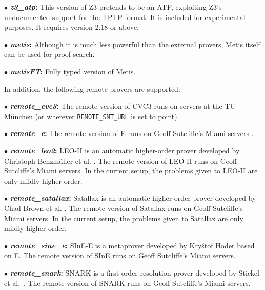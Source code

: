 \documentclass[a4paper,12pt]{article}
\begin{document}
\begin{enum}
\begin{enum}
\item[$\bullet$] \textbf{\textit{z3\_atp}:} This version of Z3 pretends to be an
ATP, exploiting Z3's undocumented support for the TPTP format. It is included
for experimental purposes. It requires version 2.18 or above.

\item[$\bullet$] \textbf{\textit{metis}:} Although it is much less powerful than
the external provers, Metis itself can be used for proof search.

\item[$\bullet$] \textbf{\textit{metisFT}:} Fully typed version of Metis.
\end{enum}

In addition, the following remote provers are supported:

\begin{enum}
\item[$\bullet$] \textbf{\textit{remote\_cvc3}:} The remote version of CVC3 runs
on servers at the TU M\"unchen (or wherever \texttt{REMOTE\_SMT\_URL} is set to
point).

\item[$\bullet$] \textbf{\textit{remote\_e}:} The remote version of E runs
on Geoff Sutcliffe's Miami servers \cite{sutcliffe-2000}.

\item[$\bullet$] \textbf{\textit{remote\_leo2}:} LEO-II is an automatic
higher-order prover developed by Christoph Benzm\"uller et al. \cite{leo2}. The
remote version of LEO-II runs on Geoff Sutcliffe's Miami servers. In the current
setup, the problems given to LEO-II are only mildly higher-order.

\item[$\bullet$] \textbf{\textit{remote\_satallax}:} Satallax is an automatic
higher-order prover developed by Chad Brown et al. \cite{satallax}. The remote
version of Satallax runs on Geoff Sutcliffe's Miami servers. In the current
setup, the problems given to Satallax are only mildly higher-order.

\item[$\bullet$] \textbf{\textit{remote\_sine\_e}:} SInE-E is a metaprover
developed by Kry\v stof Hoder \cite{sine} based on E. The remote version of
SInE runs on Geoff Sutcliffe's Miami servers.

\item[$\bullet$] \textbf{\textit{remote\_snark}:} SNARK is a first-order
resolution prover developed by Stickel et al.\ \cite{snark}. The remote version
of SNARK runs on Geoff Sutcliffe's Miami servers.


\end{enum}
\end{enum}
\end{document}
